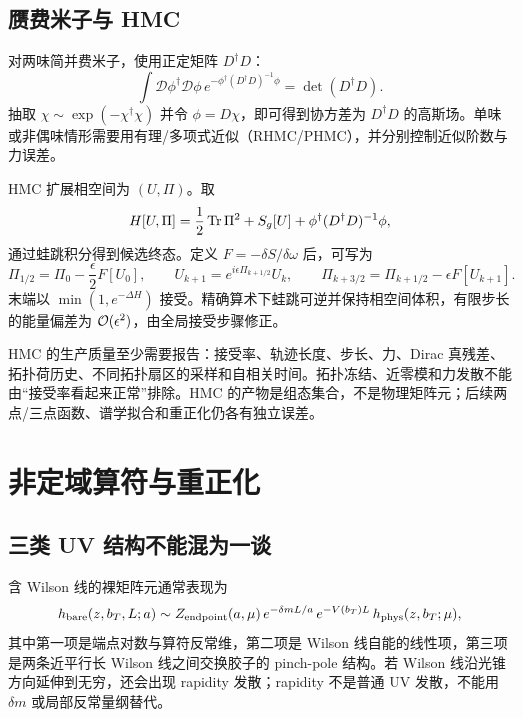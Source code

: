 \section{赝费米子与 HMC}

对两味简并费米子，使用正定矩阵 \(D^\dagger D\)：
\begin{equation}
  \int\mathcal D\phi^\dagger\mathcal D\phi\,
  e^{-\phi^\dagger(D^\dagger D)^{-1}\phi}
  =\det(D^\dagger D).
  \label{eq:b01-pseudofermion}
\end{equation}
抽取 \(\chi\sim\exp(-\chi^\dagger\chi)\) 并令 \(\phi=D\chi\)，即可得到协方差为 \(D^\dagger D\) 的高斯场。单味或非偶味情形需要用有理/多项式近似（RHMC/PHMC），并分别控制近似阶数与力误差。

HMC 扩展相空间为 \((U,\Pi)\)。取
\begin{equation}
  H[U,\Pi]=\frac12\operatorname{Tr}\Pi^2+S_g[U]
  +\phi^\dagger(D^\dagger D)^{-1}\phi,
  \label{eq:hmc-hamiltonian}
\end{equation}
通过蛙跳积分得到候选终态。定义 \(F=-\delta S/\delta\omega\) 后，可写为
\begin{equation}
  \Pi_{1/2}=\Pi_0-\frac{\epsilon}{2}F[U_0],\qquad
  U_{k+1}=e^{i\epsilon\Pi_{k+1/2}}U_k,
  \qquad
  \Pi_{k+3/2}=\Pi_{k+1/2}-\epsilon F[U_{k+1}].
  \label{eq:leapfrog}
\end{equation}
末端以 \(\min(1,e^{-\Delta H})\) 接受。精确算术下蛙跳可逆并保持相空间体积，有限步长的能量偏差为 \(\mathcal{O}(\epsilon^2)\)，由全局接受步骤修正。

HMC 的生产质量至少需要报告：接受率、轨迹长度、步长、力、Dirac 真残差、拓扑荷历史、不同拓扑扇区的采样和自相关时间。拓扑冻结、近零模和力发散不能由“接受率看起来正常”排除。HMC 的产物是组态集合，不是物理矩阵元；后续两点/三点函数、谱学拟合和重正化仍各有独立误差。

\chapter{非定域算符与重正化}

\section{三类 UV 结构不能混为一谈}

含 Wilson 线的裸矩阵元通常表现为
\begin{equation}
  h_{\rm bare}(z,b_T,L;a)
  \sim Z_{\rm endpoint}(a,\mu)\,
  e^{-\delta m L/a}\,
  e^{-V(b_T)L}\,
  h_{\rm phys}(z,b_T;\mu),
  \label{eq:nonlocal-structure}
\end{equation}
其中第一项是端点对数与算符反常维，第二项是 Wilson 线自能的线性项，第三项是两条近平行长 Wilson 线之间交换胶子的 pinch-pole 结构。若 Wilson 线沿光锥方向延伸到无穷，还会出现 rapidity 发散；rapidity 不是普通 UV 发散，不能用 \(\delta m\) 或局部反常量纲替代。

